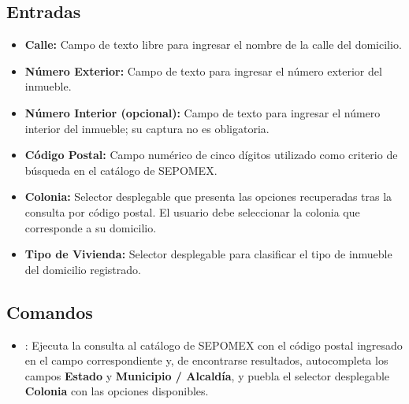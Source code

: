 \subsection{Entradas}
\begin{itemize}
	\item \textbf{Calle:} Campo de texto libre para ingresar el nombre de la 
	calle del domicilio.
	\item \textbf{Número Exterior:} Campo de texto para ingresar el número 
	exterior del inmueble.
	\item \textbf{Número Interior (opcional):} Campo de texto para ingresar el 
	número interior del inmueble; su captura no es obligatoria.
	\item \textbf{Código Postal:} Campo numérico de cinco dígitos utilizado como 
	criterio de búsqueda en el catálogo de SEPOMEX.
	\item \textbf{Colonia:} Selector desplegable que presenta las opciones 
	recuperadas tras la consulta por código postal. El usuario debe seleccionar 
	la colonia que corresponde a su domicilio.
	\item \textbf{Tipo de Vivienda:} Selector desplegable para clasificar el 
	tipo de inmueble del domicilio registrado.
\end{itemize}

\subsection{Comandos}
\begin{itemize}
	\item {}: Ejecuta la consulta al catálogo de SEPOMEX con el 
	código postal ingresado en el campo correspondiente y, de encontrarse 
	resultados, autocompleta los campos \textbf{Estado} y 
	\textbf{Municipio / Alcaldía}, y puebla el selector desplegable 
	\textbf{Colonia} con las opciones disponibles.
\end{itemize}

